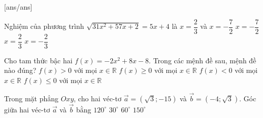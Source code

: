

[ans/ans]
\begin{ex}%
	Nghiệm của phương trình $\sqrt{31x^2 + 57x +2} = 5x + 4$ là
	\choice
	{$x= \dfrac{2}{3}$ và $x=-\dfrac{7}{2}$}
	{$x=-\dfrac{7}{2}$}
	{\True $x=\dfrac{2}{3}$}
	{$x=-\dfrac{2}{3}$}
\end{ex}

\begin{ex}%
	Cho tam thức bậc hai $f(x)= -2x^2 + 8x -8$. Trong các mệnh đề sau, mệnh đề nào đúng?
	\choice
	{$f(x)>0$ với mọi $x\in \mathbb{R}$}
	{$f(x)\geq0$ với mọi $x\in \mathbb{R}$}
	{$f(x)<0$ với mọi $x\in \mathbb{R}$}
	{\True $f(x)\leq0$ với mọi $x\in \mathbb{R}$}
\end{ex}

\begin{ex}%
	Trong mặt phẳng $Oxy$, cho hai véc-tơ $\overrightarrow{a} = \left(\sqrt{3};-15\right)$ và $\overrightarrow{b} = (-4;\sqrt{3})$. Góc giữa hai véc-tơ $\overrightarrow{a}$ và $\overrightarrow{b}$ bằng
	\choice
	{\True $120^\circ$}
	{$30^\circ$}
	{$60^\circ$}
	{$150^\circ$}
\end{ex}

